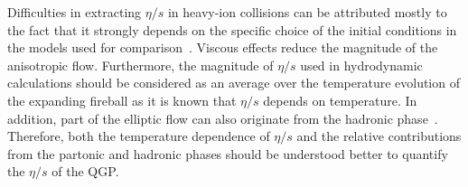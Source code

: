 Difficulties in extracting $\eta/s$ in heavy-ion collisions can be attributed mostly to the fact that it strongly depends on the specific choice of the initial conditions in the models used for comparison~\cite{Romatschke:2007mq,Luzum:2012wu,Shen:2011zc}.
Viscous effects reduce the magnitude of the anisotropic flow. Furthermore, the magnitude of $\eta/s$ used in hydrodynamic calculations should be considered as an average over the temperature evolution of the expanding fireball as it is known that $\eta/s$ depends on temperature. 
In addition, part of the elliptic flow can also originate from the hadronic phase~\cite{Bozek:2011ua,Rose:2014fba,Ryu:2015vwa}. Therefore,
both the temperature dependence of $\eta/s$ and the relative contributions from the partonic and hadronic phases should be understood better to quantify the $\eta/s$ of the QGP.

